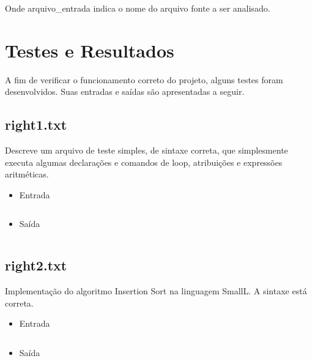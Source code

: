 \documentclass[a4paper,12pt]{report}
\begin{document}
Onde arquivo\_entrada indica o nome do arquivo fonte a ser analisado.

\section{Testes e Resultados}

A fim de verificar o funcionamento correto do projeto, alguns testes foram desenvolvidos. Suas entradas 
e saídas são apresentadas a seguir.

\subsection{right1.txt}

Descreve um arquivo de teste simples, de sintaxe correta, que simplesmente executa algumas declarações e 
comandos de loop, atribuições e expressões aritméticas.

\begin{itemize}
 \item Entrada
 
 \begin{mdframed}[linecolor=black, leftline=false, rightline=false]
    \inputminted[linenos, fontsize=\footnotesize]{text}{../input/right1.txt}
\end{mdframed}
 
 \item Saída

 \begin{mdframed}[linecolor=black, leftline=false, rightline=false]
    \inputminted[linenos, fontsize=\footnotesize]{text}{../output/right1.txt}
  \end{mdframed}
  
\end{itemize}

\subsection{right2.txt}

Implementação do algoritmo Insertion Sort na linguagem SmallL. A sintaxe está correta.

\begin{itemize}
 \item Entrada
 
 \begin{mdframed}[linecolor=black, leftline=false, rightline=false]
    \inputminted[linenos, fontsize=\footnotesize]{text}{../input/right2.txt}
\end{mdframed}
 
 \item Saída

 \begin{mdframed}[linecolor=black, leftline=false, rightline=false]
    \inputminted[linenos, fontsize=\footnotesize]{text}{../output/right2.txt}
  \end{mdframed}
  
\end{itemize}
\end{document}
